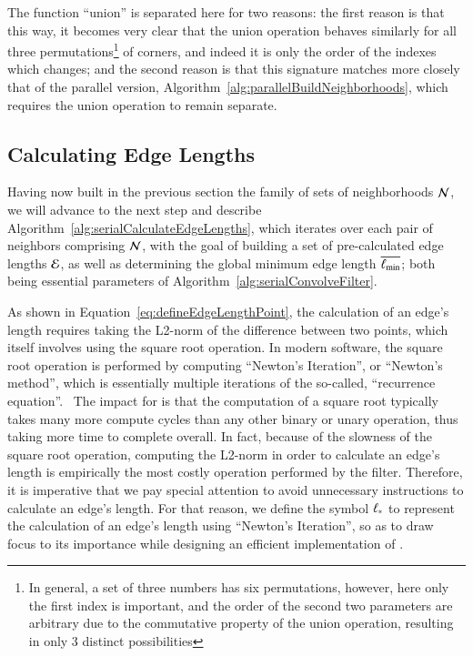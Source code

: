 The function ``union'' is separated here for two reasons: the first reason is that this way, it becomes very clear that the union operation behaves similarly for all three permutations\footnote{In general, a set of three numbers has six permutations, however, here only the first index is important, and the order of the second two parameters are arbitrary due to the commutative property of the union operation, resulting in only 3 distinct possibilities} of corners, and indeed it is only the order of the indexes which changes; and the second reason is that this signature matches more closely that of the parallel version, Algorithm~\ref{alg:parallelBuildNeighborhoods}, which requires the union operation to remain separate.

%
%
\subsection{Calculating Edge Lengths}
\label{ch5sSIssCEL}
Having now built in the previous section the family of sets of neighborhoods $\mathcal{N}$, we will advance to the next step and describe Algorithm~\ref{alg:serialCalculateEdgeLengths}, which iterates over each pair of neighbors comprising $\mathcal{N}$, with the goal of building a set of pre-calculated edge lengths $\mathcal{E}$, as well as determining the global minimum edge length $\overline{\ell_\text{min}}$; both being essential parameters of Algorithm~\ref{alg:serialConvolveFilter}.

As shown in Equation~\ref{eq:defineEdgeLengthPoint}, the calculation of an edge's length requires taking the L2-norm of the difference between two points, which itself involves using the square root operation. In modern software, the square root operation is performed by computing ``Newton's Iteration'', or ``Newton's method'', which is essentially multiple iterations of the so-called, ``recurrence equation''.~\cite{Weisstein19b} The impact for  is that the computation of a square root typically takes many more compute cycles than  any other binary or unary operation, thus taking more time to complete overall. In fact, because of the slowness of the square root operation, computing the L2-norm in order to calculate an edge's length is empirically the most costly operation performed by the filter. Therefore, it is imperative that we pay special attention to avoid unnecessary instructions to calculate an edge's length. For that reason, we define the symbol $\ell_\ast$ to represent the calculation of an edge's length using ``Newton's Iteration'', so as to draw focus to its importance while designing an efficient implementation of .%

